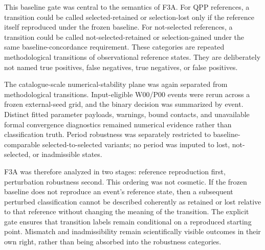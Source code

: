 \documentclass[manuscript,linenumbers]{aastex702}
\begin{document}
This baseline gate was central to the semantics of F3A. For QPP references, a transition could be called selected-retained or selection-lost only if the reference itself reproduced under the frozen baseline. For not-selected references, a transition could be called not-selected-retained or selection-gained under the same baseline-concordance requirement. These categories are repeated methodological transitions of observational reference states. They are deliberately not named true positives, false negatives, true negatives, or false positives.

The catalogue-scale numerical-stability plane was again separated from methodological transitions. Input-eligible W00/P00 events were rerun across a frozen external-seed grid, and the binary decision was summarized by event. Distinct fitted parameter payloads, warnings, bound contacts, and unavailable formal convergence diagnostics remained numerical evidence rather than classification truth. Period robustness was separately restricted to baseline-comparable selected-to-selected variants; no period was imputed to lost, not-selected, or inadmissible states.

F3A was therefore analyzed in two stages: reference reproduction first, perturbation robustness second. This ordering was not cosmetic. If the frozen baseline does not reproduce an event's reference state, then a subsequent perturbed classification cannot be described coherently as retained or lost relative to that reference without changing the meaning of the transition. The explicit gate ensures that transition labels remain conditional on a reproduced starting point. Mismatch and inadmissibility remain scientifically visible outcomes in their own right, rather than being absorbed into the robustness categories.
\end{document}
